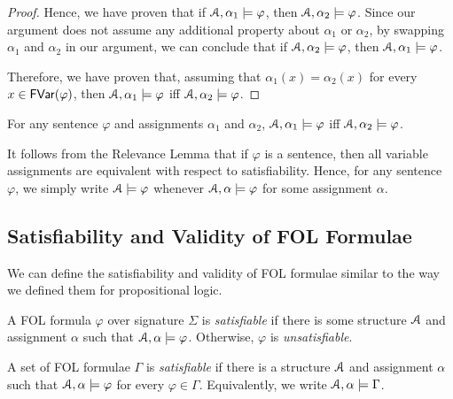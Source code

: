 \documentclass[11pt,usenames, dvipsnames]{article}
\begin{document}
\begin{proof}
  Hence, we have proven that if $\struct, \alpha_1 \models \varphi$, then $\struct, \alpha_2 \models \varphi$. Since our argument does not assume any additional property about $\alpha_1$ or $\alpha_2$, by swapping $\alpha_1$ and $\alpha_2$ in our argument, we can conclude that if $\struct, \alpha_2 \models \varphi$, then $\struct, \alpha_1 \models \varphi$.

  Therefore, we have proven that, assuming that $\alpha_1(x) = \alpha_2(x)$ for every $x \in \mathsf{FVar}(\varphi)$, then $\struct, \alpha_1 \models \varphi$ iff $\struct, \alpha_2 \models \varphi$.
\end{proof}

\begin{corollary}
  For any sentence $\varphi$ and assignments $\alpha_1$ and $\alpha_2$, $\struct, \alpha_1 \models \varphi$ iff $\struct, \alpha_2 \models \varphi$.
\end{corollary}

It follows from the Relevance Lemma that if $\varphi$ is a sentence, then all variable assignments are equivalent with respect to satisfiability. Hence, for any sentence $\varphi$, we simply write $\struct \models \varphi$ whenever $\struct, \alpha \models \varphi$ for some assignment $\alpha$.

\subsection{\large \centering Satisfiability and Validity of FOL Formulae}
\noindent

We can define the satisfiability and validity of FOL formulae similar to the way we defined them for propositional logic.

\begin{definition}[Satisfiability]
  A FOL formula $\varphi$ over signature $\Sigma$ is \emph{satisfiable} if there is some structure $\struct$ and assignment $\alpha$ such that $\struct, \alpha \models \varphi$. Otherwise, $\varphi$ is \emph{unsatisfiable}.
\end{definition}

\begin{definition}
  A set of FOL formulae $\Gamma$ is \emph{satisfiable} if there is a structure $\struct$ and assignment $\alpha$ such that $\struct, \alpha \models \varphi$ for every $\varphi \in \Gamma$. Equivalently, we write $\struct, \alpha \models \Gamma$.
\end{definition}
\end{document}
